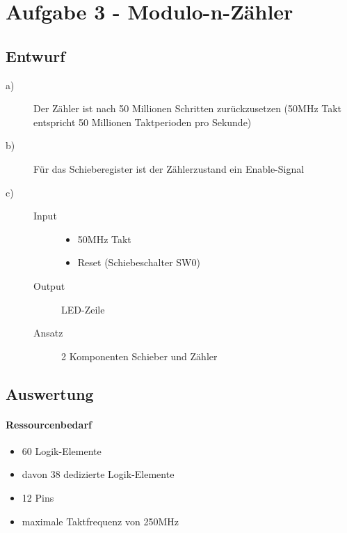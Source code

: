 \section{Aufgabe 3 - Modulo-n-Zähler}
\subsection{Entwurf}
\begin{description}
\item[a)] Der Zähler ist nach 50 Millionen Schritten zurückzusetzen (50MHz Takt entspricht 50 Millionen Taktperioden pro Sekunde)
\item[b)] Für das Schieberegister ist der Zählerzustand ein Enable-Signal
\item[c)] 
	\begin{description}
	\item[Input] 
		\begin{itemize}
			\item 50MHz Takt
			\item Reset (Schiebeschalter SW0)
		\end{itemize}
	\item[Output] LED-Zeile
	\item[Ansatz] 2 Komponenten Schieber und Zähler 
	\end{description}	
\end{description}

\subsection{Auswertung}
\paragraph{Ressourcenbedarf}
\begin{itemize} 
\item 60 Logik-Elemente
\item davon 38 dedizierte Logik-Elemente
\item 12 Pins 
\item maximale Taktfrequenz von 250MHz
\end{itemize}
